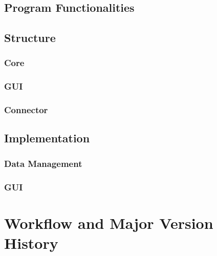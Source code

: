 \documentclass[10pt,a4paper,titlepage]{article}
\begin{document}
	\subsection{Program Functionalities}
	\subsection{Structure}
	\subsubsection{Core}
	\subsubsection{GUI}
	\subsubsection{Connector}
	\subsection{Implementation}
	\subsubsection{Data Management}
	
	\subsubsection{GUI}
	\section{Workflow and Major Version History}
\end{document}
